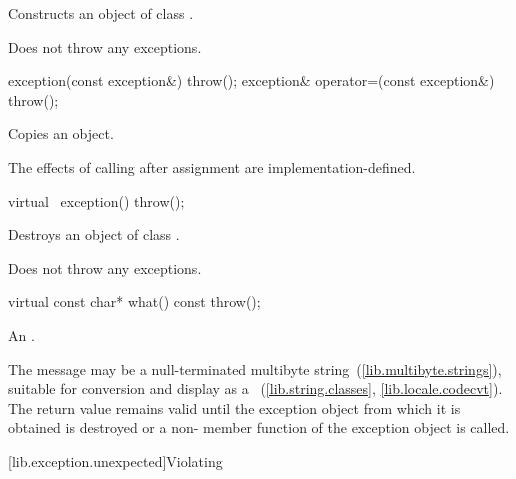 \begin{itemdescr}
\pnum
\effects
Constructs an object of class
.

\pnum
\notes
Does not throw any exceptions.
\end{itemdescr}

%
\begin{itemdecl}
exception(const exception&) throw();
exception& operator=(const exception&) throw();
\end{itemdecl}

\begin{itemdescr}
\pnum
\effects
Copies an
object.

\pnum
\notes
The effects of calling  after assignment are
implementation-defined.
\end{itemdescr}

%
%
\begin{itemdecl}
virtual ~exception() throw();
\end{itemdecl}

\begin{itemdescr}
\pnum
\effects
Destroys an object of class
.

\pnum
\notes
Does not throw any exceptions.
\end{itemdescr}

%
\begin{itemdecl}
virtual const char* what() const throw();
\end{itemdecl}

\begin{itemdescr}
\pnum
\returns
{}%
An  \ntbs.

\pnum
\notes
The message may be a null-terminated multibyte string~(\ref{lib.multibyte.strings}),
suitable for conversion and display as a
~(\ref{lib.string.classes}, \ref{lib.locale.codecvt}).
The return value remains valid until the exception object from which
it is obtained is destroyed or a non-
member function of the exception object is called.
\end{itemdescr}

[lib.exception.unexpected]{Violating }

